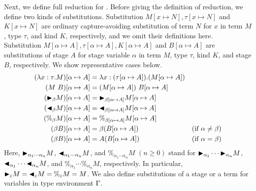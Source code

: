 Next, we define full reduction for \LMD.
Before giving the definition of reduction, we define two kinds of substitutions.
Substitution $M[x\mapsto N], \tau[x \mapsto N]$ and $K[x \mapsto N]$ are
ordinary capture-avoiding substitution of
term $N$ for $x$ in term $M$, type $\tau$, and kind $K$, respectively,
and we omit their definitions here.
Substitution $M[\alpha \mapsto A], \tau [\alpha \mapsto A], K[\alpha \mapsto A]$ and $B[\alpha\mapsto A]$ are
substitutions of stage $A$ for stage variable $\alpha$ in term $M$, type $\tau$, kind $K$, and stage $B$, respectively.
We show representative cases below.
%
{%
\begin{align*}
    (\lambda x:\tau.M)[\alpha \mapsto A] & = \lambda x:(\tau[\alpha \mapsto A]).(M[\alpha \mapsto A])                                  \\
    (M\ B)[\alpha \mapsto A]             & = (M[\alpha \mapsto A])\ B[\alpha\mapsto A]                                                 \\
    ({\mathop{\blacktriangleright}}_\beta M)[\alpha \mapsto A]      & = {\mathop{\blacktriangleright}}_{\beta[\alpha \mapsto A]}M[\alpha \mapsto A]                                          \\
    ({\mathop{\blacktriangleleft}}_\beta M)[\alpha \mapsto A]     & = {\mathop{\blacktriangleleft}}_{\beta[\alpha \mapsto A]}M[\alpha \mapsto A]                                         \\
    (\%_\beta M)[\alpha \mapsto A]       & = \%_{\beta[\alpha \mapsto A]}M[\alpha \mapsto A]                                           \\
    (\beta B)[\alpha \mapsto A]          & = \beta (B[\alpha\mapsto A])                               & (\text{if } \alpha \neq \beta) \\
    (\beta B)[\alpha \mapsto A]          & = A (B[\alpha\mapsto A])                                   & (\text{if } \alpha = \beta)
\end{align*}
}
Here, ${\mathop{\blacktriangleright}}_{\alpha_1\cdots\alpha_n} M$,
${\mathop{\blacktriangleleft}}_{\alpha_1\cdots\alpha_n} M$, and $\%_{\alpha_1\cdots\alpha_n} M$
$(n \geq 0)$ stand for ${\mathop{\blacktriangleright}}_{\alpha_1} \cdots {\mathop{\blacktriangleright}}_{\alpha_n} M$,
${\mathop{\blacktriangleleft}}_{\alpha_1}\cdots {\mathop{\blacktriangleleft}}_{\alpha_n} M$, and
$\%_{\alpha_1}\cdots \%_{\alpha_n} M$, respectively.  In particular,
${\mathop{\blacktriangleright}}_{\varepsilon} M = {\mathop{\blacktriangleleft}}_{\varepsilon} M = \%_{\varepsilon} M = M$.
We also define substitutions of a stage or a term for variables in type environment $\Gamma$.


